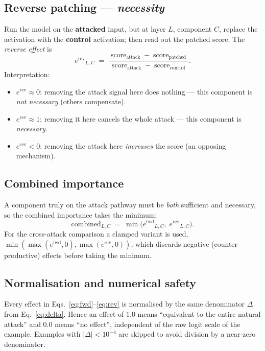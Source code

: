 \documentclass[11pt]{article}
\newcommand{\fwd}{\ensuremath{e^{\mathrm{fwd}}}}
\newcommand{\rev}{\ensuremath{e^{\mathrm{rev}}}}
\newcommand{\score}{\operatorname{score}}
\begin{document}
\subsection{Reverse patching — \emph{necessity}}

Run the model on the \textbf{attacked} input, but at layer $L$, component $C$,
replace the activation with the \textbf{control} activation; then read out the
patched score. The \emph{reverse effect} is
\begin{equation}
\rev_{L,C} \;=\;
\frac{\score_{\text{attack}} - \score_{\text{patched}}}
     {\score_{\text{attack}} - \score_{\text{control}}}.
\label{eq:rev}
\end{equation}
Interpretation:
\begin{itemize}[nosep]
  \item $\rev \approx 0$: removing the attack signal here does nothing — this
        component is \emph{not necessary} (others compensate).
  \item $\rev \approx 1$: removing it here cancels the whole attack — this
        component is \emph{necessary}.
  \item $\rev < 0$: removing the attack here \emph{increases} the score
        (an opposing mechanism).
\end{itemize}

\subsection{Combined importance}

A component truly on the attack pathway must be \emph{both} sufficient and
necessary, so the combined importance takes the minimum:
\begin{equation}
\text{combined}_{L,C} \;=\; \min\!\big(\fwd_{L,C},\; \rev_{L,C}\big).
\label{eq:combined}
\end{equation}
For the cross-attack comparison a clamped variant is used,
$\min(\max(\fwd,0),\max(\rev,0))$, which discards negative (counter-productive)
effects before taking the minimum.

\subsection{Normalisation and numerical safety}

Every effect in Eqs.~\eqref{eq:fwd}--\eqref{eq:rev} is normalised by the same
denominator $\Delta$ from Eq.~\eqref{eq:delta}. Hence an effect of $1.0$ means
``equivalent to the entire natural attack'' and $0.0$ means ``no effect'',
independent of the raw logit scale of the example. Examples with
$|\Delta| < 10^{-4}$ are skipped to avoid division by a near-zero denominator.
\end{document}
